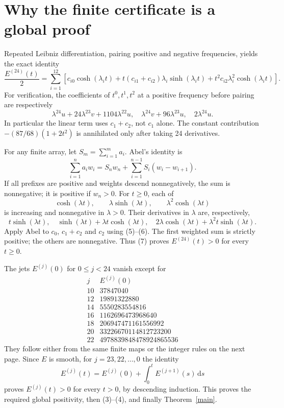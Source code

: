 \documentclass[11pt]{article}
\newcommand{\dd}{\mathrm d}
\begin{document}
\section{Why the finite certificate is a global proof}
Repeated Leibniz differentiation, pairing positive and negative frequencies, yields the exact identity
\[
 \frac{E^{(24)}(t)}2=\sum_{i=1}^{12}\left[
 c_{i0}\cosh(\lambda_it)+t(c_{i1}+c_{i2})\lambda_i\sinh(\lambda_it)
 +t^2c_{i2}\lambda_i^2\cosh(\lambda_it)\right].                \tag{7}
\]
For verification, the coefficients of $t^0,t^1,t^2$ at a positive frequency before pairing are respectively
\[
 \lambda^{24}u+24\lambda^{23}v+1104\lambda^{22}u,
 \quad\lambda^{24}v+96\lambda^{23}u,\quad2\lambda^{24}u.
\]
In particular the linear term uses $c_1+c_2$, not $c_1$ alone. The constant contribution $-(87/68)(1+2t^2)$ is annihilated only after taking 24 derivatives.

For any finite array, let $S_m=\sum_{i=1}^m a_i$. Abel's identity is
\[
 \sum_{i=1}^n a_iw_i=S_nw_n+\sum_{i=1}^{n-1}S_i(w_i-w_{i+1}).
\]
If all prefixes are positive and weights descend nonnegatively, the sum is nonnegative; it is positive if $w_n>0$. For $t\ge0$, each of
\[
 \cosh(\lambda t),\qquad\lambda\sinh(\lambda t),\qquad
 \lambda^2\cosh(\lambda t)
\]
is increasing and nonnegative in $\lambda>0$. Their derivatives in $\lambda$ are, respectively,
\[
 t\sinh(\lambda t),\quad\sinh(\lambda t)+\lambda t\cosh(\lambda t),
 \quad2\lambda\cosh(\lambda t)+\lambda^2t\sinh(\lambda t).
\]
Apply Abel to $c_0$, $c_1+c_2$ and $c_2$ using (5)--(6). The first weighted sum is strictly positive; the others are nonnegative. Thus (7) proves $E^{(24)}(t)>0$ for every $t\ge0$.

The jets $E^{(j)}(0)$ for $0\le j<24$ vanish except for
\[
\begin{array}{c|r}
j&E^{(j)}(0)\\\hline
10&37847040\\12&19891322880\\14&5550283554816\\
16&1162696473968640\\18&206947471161556992\\
20&33226670114812723200\\22&4978839848478924865536
\end{array}
\]
They follow either from the same finite maps or the integer rules on the next page. Since $E$ is smooth, for $j=23,22,\ldots,0$ the identity
\[
 E^{(j)}(t)=E^{(j)}(0)+\int_0^t E^{(j+1)}(s)\,\dd s
\]
proves $E^{(j)}(t)>0$ for every $t>0$, by descending induction. This proves the required global positivity, then (3)--(4), and finally Theorem~\ref{main}.
\newpage
\end{document}
